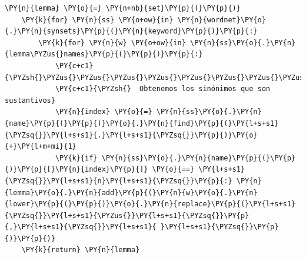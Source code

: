 \begin{tcolorbox}[breakable, size=fbox, boxrule=1pt, pad at break*=1mm,colback=cellbackground, colframe=cellborder]
\begin{Verbatim}[commandchars=\\\{\}]
    \PY{n}{lemma} \PY{o}{=} \PY{n+nb}{set}\PY{p}{(}\PY{p}{)}
    \PY{k}{for} \PY{n}{ss} \PY{o+ow}{in} \PY{n}{wordnet}\PY{o}{.}\PY{n}{synsets}\PY{p}{(}\PY{n}{keyword}\PY{p}{)}\PY{p}{:}
        \PY{k}{for} \PY{n}{w} \PY{o+ow}{in} \PY{n}{ss}\PY{o}{.}\PY{n}{lemma\PYZus{}names}\PY{p}{(}\PY{p}{)}\PY{p}{:}
            \PY{c+c1}{\PYZsh{}\PYZus{}\PYZus{}\PYZus{}\PYZus{}\PYZus{}\PYZus{}\PYZus{}\PYZus{}\PYZus{}\PYZus{}\PYZus{}\PYZus{}\PYZus{}\PYZus{}\PYZus{}\PYZus{}\PYZus{}\PYZus{}\PYZus{}\PYZus{}\PYZus{}\PYZus{}\PYZus{}\PYZus{}\PYZus{}\PYZus{}\PYZus{}\PYZus{}\PYZus{}\PYZus{}\PYZus{}}
            \PY{c+c1}{\PYZsh{}  Obtenemos los sinónimos que son sustantivos}
            \PY{n}{index} \PY{o}{=} \PY{n}{ss}\PY{o}{.}\PY{n}{name}\PY{p}{(}\PY{p}{)}\PY{o}{.}\PY{n}{find}\PY{p}{(}\PY{l+s+s1}{\PYZsq{}}\PY{l+s+s1}{.}\PY{l+s+s1}{\PYZsq{}}\PY{p}{)}\PY{o}{+}\PY{l+m+mi}{1}
            \PY{k}{if} \PY{n}{ss}\PY{o}{.}\PY{n}{name}\PY{p}{(}\PY{p}{)}\PY{p}{[}\PY{n}{index}\PY{p}{]} \PY{o}{==} \PY{l+s+s1}{\PYZsq{}}\PY{l+s+s1}{n}\PY{l+s+s1}{\PYZsq{}}\PY{p}{:} \PY{n}{lemma}\PY{o}{.}\PY{n}{add}\PY{p}{(}\PY{n}{w}\PY{o}{.}\PY{n}{lower}\PY{p}{(}\PY{p}{)}\PY{o}{.}\PY{n}{replace}\PY{p}{(}\PY{l+s+s1}{\PYZsq{}}\PY{l+s+s1}{\PYZus{}}\PY{l+s+s1}{\PYZsq{}}\PY{p}{,}\PY{l+s+s1}{\PYZsq{}}\PY{l+s+s1}{ }\PY{l+s+s1}{\PYZsq{}}\PY{p}{)}\PY{p}{)}
    \PY{k}{return} \PY{n}{lemma}   
\end{Verbatim}
\end{tcolorbox}

